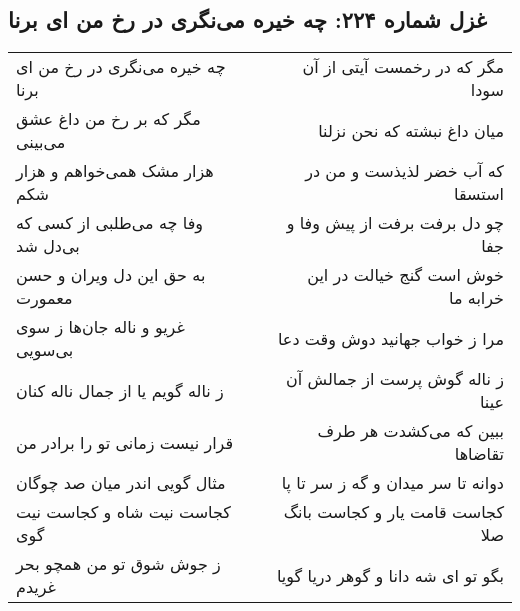 \begin{center}
\section*{غزل شماره ۲۲۴: چه خیره می‌نگری در رخ من ای برنا}
\label{sec:0224}
\begin{longtable}{l p{0.5cm} r}
چه خیره می‌نگری در رخ من ای برنا
&&
مگر که در رخمست آیتی از آن سودا
\\
مگر که بر رخ من داغ عشق می‌بینی
&&
میان داغ نبشته که نحن نزلنا
\\
هزار مشک همی‌خواهم و هزار شکم
&&
که آب خضر لذیذست و من در استسقا
\\
وفا چه می‌طلبی از کسی که بی‌دل شد
&&
چو دل برفت برفت از پیش وفا و جفا
\\
به حق این دل ویران و حسن معمورت
&&
خوش است گنج خیالت در این خرابه ما
\\
غریو و ناله جان‌ها ز سوی بی‌سویی
&&
مرا ز خواب جهانید دوش وقت دعا
\\
ز ناله گویم یا از جمال ناله کنان
&&
ز ناله گوش پرست از جمالش آن عینا
\\
قرار نیست زمانی تو را برادر من
&&
ببین که می‌کشدت هر طرف تقاضاها
\\
مثال گویی اندر میان صد چوگان
&&
دوانه تا سر میدان و گه ز سر تا پا
\\
کجاست نیت شاه و کجاست نیت گوی
&&
کجاست قامت یار و کجاست بانگ صلا
\\
ز جوش شوق تو من همچو بحر غریدم
&&
بگو تو ای شه دانا و گوهر دریا گویا
\\
\end{longtable}
\end{center}
